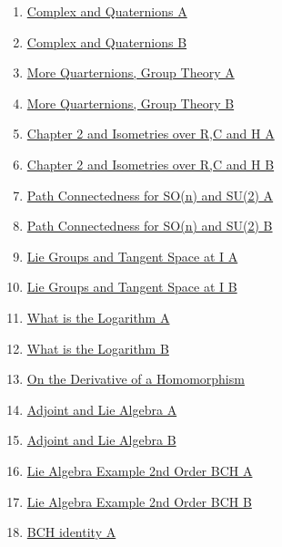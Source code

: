 \documentclass[11pt]{article}
\begin{document}
\begin{multicols}{2}
	\begin{enumerate}
		\item \href{https://mp.weixin.qq.com/s/x-UF4pDMjndGrJT3x1CGiQ}{Complex and Quaternions A}	%
		\item \href{https://mp.weixin.qq.com/s/GuPuIMSO7G4MY4DhIihEfw}{Complex and Quaternions B}	%
		\item \href{https://mp.weixin.qq.com/s/YtAKBDXOo2pia-dSMRH7HQ}{More Quarternions, Group Theory A}	%
		\item \href{https://mp.weixin.qq.com/s/fljckonm67g_pRAdCaFcJg}{More Quarternions, Group Theory B}	%
		\item \href{https://mp.weixin.qq.com/s/P118r_NB0sxGGnxnYNiAwQ}{Chapter 2 and Isometries over R,C and H A}	%
		\item \href{https://mp.weixin.qq.com/s/ACRDY2i14U0xPQrl2v2RxA}{Chapter 2 and Isometries over R,C and H B}	%
		\item \href{https://mp.weixin.qq.com/s/5koyHawx4MRgj8iiKTDCyg}{Path Connectedness for SO(n) and SU(2) A}	%
		\item \href{https://mp.weixin.qq.com/s/NJIFSi52FnAI-uJF70klDQ}{Path Connectedness for SO(n) and SU(2) B}	%
		\item \href{https://mp.weixin.qq.com/s/dR7yTlKYjH5EbnDdZwRZPQ}{Lie Groups and Tangent Space at I A}	%
		\item \href{https://mp.weixin.qq.com/s/b2V8H16NGo_4BUsALM0oCw}{Lie Groups and Tangent Space at I B}	%
		\item \href{https://mp.weixin.qq.com/s/JDFldkDu_v71yX6dmKDxyw}{What is the Logarithm A}	%
		\item \href{https://mp.weixin.qq.com/s/GkMqcSofxPxiWRZpc9mm6A}{What is the Logarithm B}	%
		\item \href{https://mp.weixin.qq.com/s/KBCdN94IRn3eOaE2tv4vvQ}{On the Derivative of a Homomorphism}	%
		\item \href{https://mp.weixin.qq.com/s/YSfcwFZjNwBMxhhL6SuwYw}{Adjoint and Lie Algebra A}	%
		\item \href{https://mp.weixin.qq.com/s/I3GfdSZcQwzZBW7vpQhZzw}{Adjoint and Lie Algebra B}	%
		\item \href{https://mp.weixin.qq.com/s/VMjUwhgDxd8Fa8zr47JCUA}{Lie Algebra Example 2nd Order BCH A}	%
		\item \href{https://mp.weixin.qq.com/s/P1GXkqYxQeT6rBd-E01GgA}{Lie Algebra Example 2nd Order BCH B}	%
		\item \href{https://mp.weixin.qq.com/s/xsUCU1QLKeDvSH3gjaignw}{BCH identity A}	%

\end{enumerate}
\end{multicols}
\end{document}
